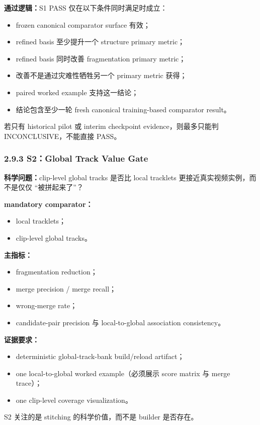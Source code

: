 \documentclass[UTF8]{ctexart}
\begin{document}
\textbf{通过逻辑：}S1 PASS 仅在以下条件同时满足时成立：
\begin{itemize}
\item frozen canonical comparator surface 有效；
\item refined basis 至少提升一个 structure primary metric；
\item refined basis 同时改善 fragmentation primary metric；
\item 改善不是通过灾难性牺牲另一个 primary metric 获得；
\item paired worked example 支持这一结论；
\item 结论包含至少一轮 fresh canonical training-based comparator result。
\end{itemize}
若只有 historical pilot 或 interim checkpoint evidence，则最多只能判 INCONCLUSIVE，不能直接 PASS。

\subsubsection*{2.9.3 S2：Global Track Value Gate}
\textbf{科学问题：}clip-level global tracks 是否比 local tracklets 更接近真实视频实例，而不是仅仅 ``被拼起来了''？

\textbf{mandatory comparator：}
\begin{itemize}
\item local tracklets；
\item clip-level global tracks。
\end{itemize}

\textbf{主指标：}
\begin{itemize}
\item fragmentation reduction；
\item merge precision / merge recall；
\item wrong-merge rate；
\item candidate-pair precision 与 local-to-global association consistency。
\end{itemize}

\textbf{证据要求：}
\begin{itemize}
\item deterministic global-track-bank build/reload artifact；
\item one local-to-global worked example（必须展示 score matrix 与 merge trace）；
\item one clip-level coverage visualization。
\end{itemize}
S2 关注的是 stitching 的科学价值，而不是 builder 是否存在。
\end{document}

